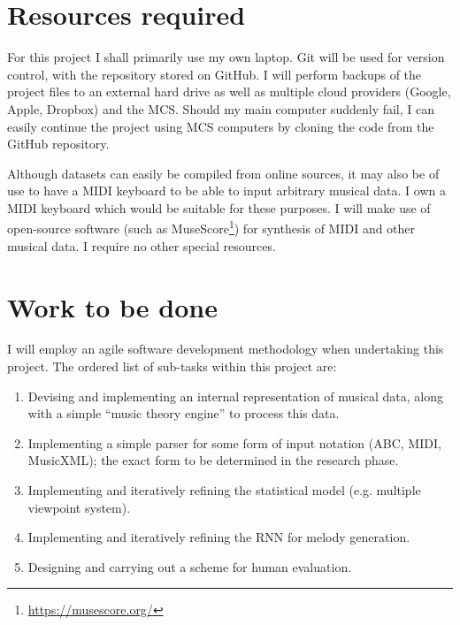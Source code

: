 \documentclass[12pt,a4paper,twoside]{article}
\begin{document}
\section*{Resources required}

For this project I shall primarily use my own laptop. Git will be used for
version control, with the repository stored on GitHub. I will perform backups of
the project files to an external hard drive as well as multiple cloud providers
(Google, Apple, Dropbox) and the MCS. Should my main computer suddenly fail, I
can easily continue the project using MCS computers by cloning the code from the
GitHub repository.

Although datasets can easily be compiled from online sources, it may also be of
use to have a MIDI keyboard to be able to input arbitrary musical data. I own a
MIDI keyboard which would be suitable for these purposes. I will make use of
open-source software (such as MuseScore\footnote{\url{https://musescore.org/}})
for synthesis of MIDI and other musical data. I require no other special
resources.

\section*{Work to be done}

I will employ an agile software development methodology when undertaking this
project. The ordered list of sub-tasks within this project are:
\begin{enumerate}

\item Devising and implementing an internal representation of musical data,
	along with a simple ``music theory engine'' to process this data.  

\item Implementing a simple parser for some form of input notation (ABC, MIDI,
	MusicXML); the exact form to be determined in the research phase.  

\item Implementing and iteratively refining the statistical model (e.g. multiple
	viewpoint system).

\item Implementing and iteratively refining the RNN for melody generation.  

\item Designing and carrying out a scheme for human evaluation.

\end{enumerate}
\end{document}
